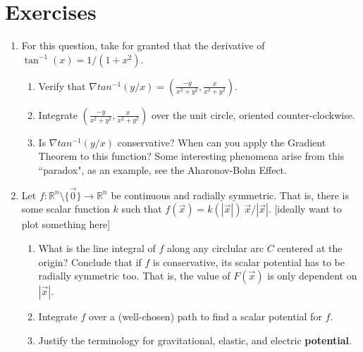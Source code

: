 \documentclass[11pt,openany]{book}
\newcommand*{\exercises}{\section*{\exercisename}}
\newcommand{\exercisename}{Exercises}
\begin{document}
	\exercises
	\begin{enumerate}
		
		\item For this question, take for granted that the derivative of $\tan^{-1}(x) = 1/(1+x^2)$. \begin{enumerate}
			\item Verify that $\nabla tan^{-1}(y/x) = (\frac{-y}{x^2+y^2}, \frac{x}{x^2+y^2})$.
			\item Integrate $(\frac{-y}{x^2+y^2}, \frac{x}{x^2+y^2})$ over the unit circle, oriented counter-clockwise.
			\item Is $\nabla tan^{-1}(y/x)$ conservative? When can you apply the Gradient Theorem to this function? Some interesting phenomena arise from this ``paradox", as an example, see the Aharonov-Bohn Effect.
		\end{enumerate}
		\item Let $f:\mathbb{R}^n\setminus\{\vec{0}\} \to\mathbb{R}^n$ be continuous and radially symmetric. That is, there is some scalar function $k$ such that $f(\vec{x})= k(|\vec{x}|) \ \vec{x}/ |\vec{x}|$. [ideally want to plot something here] \begin{enumerate}
			\item What is the line integral of $f$ along any circlular arc $C$ centered at the origin? Conclude that if $f$ is conservative, its scalar potential has to be radially symmetric too. 
			That is, the value of $F(\vec{x})$ is only dependent on $|\vec{x}|$.
			\item Integrate $f$ over a (well-chosen) path to find a scalar potential for $f$.
			\item Justify the terminology for gravitational, elastic, and electric \textbf{potential}.  
		\end{enumerate}
		
	\end{enumerate}
	
\end{document}
